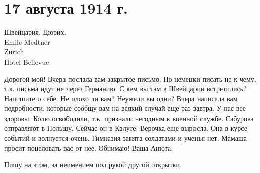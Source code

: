 \section{17 августа 1914 г.}


Швейцария. Цюрих. \\
Emile Medtner \\
Zurich \\
Hotel Bellevue


Дорогой мой! Вчера послала вам закрытое письмо. По-немецки писать не к чему,
т.к. письма идут не через Германию. С кем вы там в Швейцарии встретились?
Напишите о себе. Не плохо ли вам? Неужели вы одни? Вчера написала вам
подробности, которые сообщу вам на всякий случай еще раз завтра. У нас все
здоровы. Колю освободили, т.к. признали негодным к военной службе. Сабурова
отправляют в Польшу. Сейчас он в Калуге. Верочка еще выросла. Она в курсе
событий и волнуется очень. Гимназия занята солдатами и ученья нет. Мамаша
просит поцеловать вас от нее. Обнимаю! Ваша Анюта.

Пишу на этом, за неимением под рукой другой открытки.
